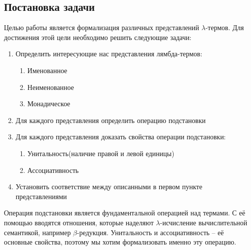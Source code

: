 \subsection{Постановка задачи}
Целью работы является формализация различных представлений $\lambda$-термов. Для достижения этой цели необходимо решить следующие задачи:

\begin{enumerate}
  \item Определить интересующие нас представления лямбда-термов:
    \begin{enumerate}
      \item Именованное
      \item Неименованное
      \item Монадическое
    \end{enumerate}
  \item Для каждого представления определить операцию подстановки
  \item Для каждого представления доказать свойства операции подстановки:
    \begin{enumerate}
      \item Унитальность(наличие правой и левой единицы)
      \item Ассоциативность
    \end{enumerate}
  \item Установить соответствие между описанными в первом пункте представлениями
\end{enumerate}

Операция подстановки является фундаментальной операцией над термами. С её помощью вводятся отношения, которые наделяют $\lambda$-исчисление вычислительной семантикой, например $\beta$-редукция. Унитальность и ассоциативность -- её основные свойства, поэтому мы хотим формализовать именно эту операцию.

